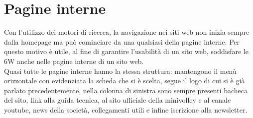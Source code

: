 \section{Pagine interne}
	Con l'utilizzo dei motori di ricerca, la navigazione nei siti web non inizia sempre
	dalla homepage ma può cominciare da una qualsiasi della pagine interne. 
	Per questo motivo è utile, al fine di garantire l'usabilità di un sito web,
	soddisfare le 6W anche nelle pagine interne di un sito web.
	\\
	Quasi tutte le pagine interne hanno la stessa struttura:
	mantengono il menù orizzontale con evidenziata la scheda che si è scelta, segue 
	il logo di cui si è già parlato precedentemente, nella colonna di sinistra sono
	sempre presenti bacheca del sito, link alla guida tecnica, al sito ufficiale
	della minivolley e al canale youtube, news della società, collegamenti utili e 
	infine iscrizione alla newsletter.
	

